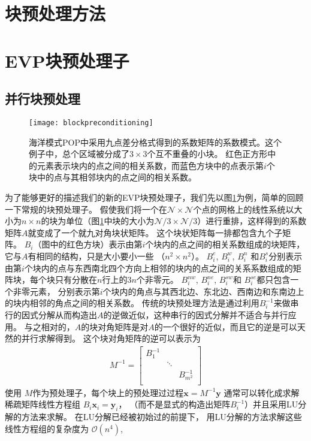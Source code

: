 \section{块预处理方法}
\label{precond:block}

\section{EVP块预处理子} \label{precond:EVP}
 

\subsection{并行块预处理} \label{precond:EVP:Parallel}
 
\begin{figure}
\centering
\texttt{[image: blockpreconditioning]}
\caption[] {海洋模式POP中采用九点差分格式得到的系数矩阵的系数模式。这个例子中，总个区域被分成了$3\times3$个互不重叠的小块。
红色正方形中的元素表示块内的点之间的相关系数，而蓝色方块中的点表示第$i$个块中的点与其相邻块内的点之间的相关系数。 \label{fig:blockprecond}}
\end{figure}
 
为了能够更好的描述我们的新的EVP块预处理子，我们先以图\ref{fig:blockprecond}为例，简单的回顾一下常规的块预处理子。 
假使我们将一个在$\mathcal{N} \times \mathcal{N}$个点的网格上的线性系统以大小为$n\times n$的块为单位（图\ref{fig:blockprecond}中块的大小为$\mathcal{N}/3\times \mathcal{N}/3$）进行重排，这样得到的系数矩阵$A$就变成了一个就九对角块状矩阵。
这个块状矩阵每一排都包含九个子矩阵。 
$B_i$（图中的红色方块）表示由第$i$个块内的点之间的相关系数组成的块矩阵，它与$A$有相同的结构，只是大小要小一些 （$n^2\times n^2$）。 
$B_i^e$, $B_i^w$, $B_i^n$ 和$B_i^s$分别表示由第$i$个块内的点与东西南北四个方向上相邻的块内的点之间的关系系数组成的矩阵块，每个块只有分散在$n$行上的$3n$个非零元。
$B_i^{nw}$, $B_i^{ne}$, $B_i^{sw}$和 $B_i^{se}$都只包含一个非零元素， 分别表示第$i$个块内的角点与其西北边、东北边、西南边和东南边上的块内相邻的角点之间的相关系数。 
传统的块预处理方法是通过利用$B_i^{-1}$来做串行的因式分解从而构造出$A$的逆做近似，这种串行的因式分解并不适合与并行应用。
与之相对的，$A$的块对角矩阵是对$A$的一个很好的近似，而且它的逆是可以天然的并行求解得到。
这个块对角矩阵的逆可以表示为 
\begin{eqnarray*}
M^{-1}=    \left [
        \begin{array}{ccccccc}
        B_1^{-1} &   &  \\
         & \ddots&  \\
        &   &  B_{m^2}^{-1} \\
    \end{array}
    \right ]
\end{eqnarray*}
使用 $M$作为预处理子，每个块上的预处理过过程$\textbf{x}
= M^{-1}\textbf{y}$ 通常可以转化成求解稀疏矩阵线性方程组 $B_i \textbf{x}_i = \textbf{y}_i$，
（而不是显式的构造出矩阵$B_i^{-1}$）并且采用LU分解的方法来求解。  
在LU分解已经被初始过的前提下， 用LU分解的方法求解这些线性方程组的复杂度为 $\mathcal{O}(n^4)$,
 


